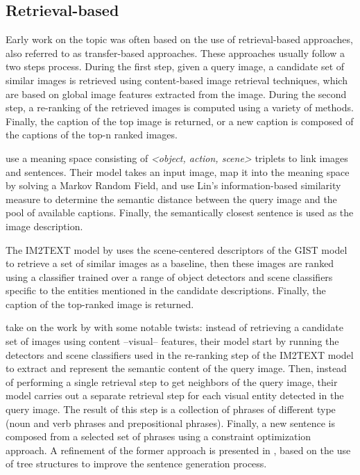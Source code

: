 \subsection{Retrieval-based} \label{subsec:retrieval-based_methods}

Early work on the topic was often based on the use of retrieval-based approaches, also referred to as transfer-based approaches. These approaches usually follow a two steps process. During the first step, given a query image, a candidate set of similar images is retrieved using content-based image retrieval techniques, which are based on global image features extracted from the image. During the second step, a re-ranking of the retrieved images is computed using a variety of methods. Finally, the caption of the top image is returned, or a new caption is composed of the captions of the top-n ranked images.

\citet{Farhadi2010} use a meaning space consisting of \textit{<object, action, scene>} triplets to link images and sentences. Their model takes an input image, map it into the meaning space by solving a Markov Random Field, and use Lin's information-based similarity measure \citep{Lin1998} to determine the semantic distance between the query image and the pool of available captions. Finally, the semantically closest sentence is used as the image description.

The IM2TEXT model by \citet{Ordonez2011} uses the scene-centered descriptors of the GIST model \citep{Oliva2006, Torralba2008} to retrieve a set of similar images as a baseline, then these images are ranked using a classifier trained over a range of object detectors and scene classifiers specific to the entities mentioned in the candidate descriptions. Finally, the caption of the top-ranked image is returned. 

\citet{Kuznetsova2012} take on the work by \citet{Ordonez2011} with some notable twists: instead of retrieving a candidate set of images using content --visual-- features, their model start by running the detectors and scene classifiers used in the re-ranking step of the IM2TEXT model to extract and represent the semantic content of the query image. Then, instead of performing a single retrieval step to get neighbors of the query image, their model carries out a separate retrieval step for each visual entity detected in the query image. The result of this step is a collection of phrases of different type (noun and verb phrases and prepositional phrases). Finally, a new sentence is composed from a selected set of phrases using a constraint optimization approach. A refinement of the former approach is presented in \citet{Kuznetsova2014}, based on the use of tree structures to improve the sentence generation process.

